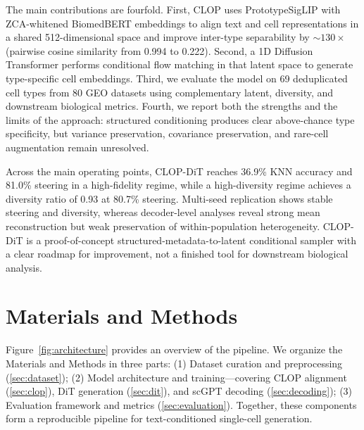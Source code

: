 \documentclass[genes,article,submit,pdftex,oneauthor]{Definitions/mdpi}
\begin{document}
The main contributions are fourfold. First, CLOP uses PrototypeSigLIP with ZCA-whitened BiomedBERT embeddings to align text and cell representations in a shared 512-dimensional space and improve inter-type separability by ${\sim}130\times$ (pairwise cosine similarity from 0.994 to 0.222). Second, a 1D Diffusion Transformer performs conditional flow matching in that latent space to generate type-specific cell embeddings. Third, we evaluate the model on 69 deduplicated cell types from 80 GEO datasets using complementary latent, diversity, and downstream biological metrics. Fourth, we report both the strengths and the limits of the approach: structured conditioning produces clear above-chance type specificity, but variance preservation, covariance preservation, and rare-cell augmentation remain unresolved.

Across the main operating points, CLOP-DiT reaches 36.9\% KNN accuracy and 81.0\% steering in a high-fidelity regime, while a high-diversity regime achieves a diversity ratio of 0.93 at 80.7\% steering. Multi-seed replication shows stable steering and diversity, whereas decoder-level analyses reveal strong mean reconstruction but weak preservation of within-population heterogeneity. CLOP-DiT is a proof-of-concept structured-metadata-to-latent conditional sampler with a clear roadmap for improvement, not a finished tool for downstream biological analysis.

\section{Materials and Methods}

Figure~\ref{fig:architecture} provides an overview of the pipeline.
We organize the Materials and Methods in three parts:
(1) Dataset curation and preprocessing (\ref{sec:dataset});
(2) Model architecture and training---covering CLOP alignment (\ref{sec:clop}),
DiT generation (\ref{sec:dit}), and scGPT decoding (\ref{sec:decoding});
(3) Evaluation framework and metrics (\ref{sec:evaluation}).
Together, these components form a reproducible pipeline for text-conditioned single-cell generation.
\end{document}
